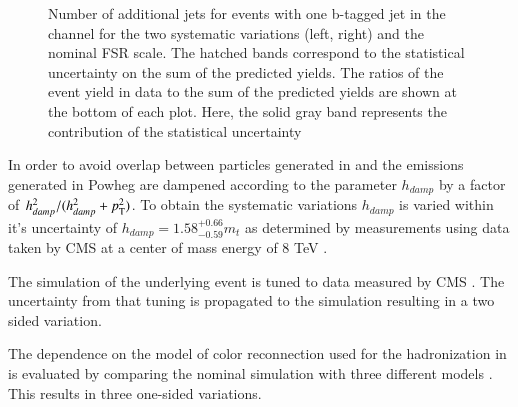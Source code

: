 \begin{figure}[htbp!]
\begin{center}
\caption{Number of additional jets for events with one b-tagged jet in the \emu channel for the two systematic variations (left, right) and the nominal FSR scale.
The hatched bands correspond to the statistical uncertainty on the sum of the predicted yields. 
        The ratios of the event yield in data to the sum of the predicted yields are
        shown at the bottom of each plot. Here, the solid gray band
        represents the contribution of the statistical uncertainty
  \label{fig:control_var_TT_FSRSCALE}}
  \end{center}
\end{figure}


In order to avoid overlap between particles generated in \POWHEG and \PYTHIA the emissions generated in Powheg are dampened according to the parameter $h_{damp}$ by a factor of $h_{damp}^2 / (h_{damp}^2 + p_{\mathrm{T}}^2)$.
To obtain the systematic variations $h_{damp}$ is varied within it's uncertainty of $h_{damp} = 1.58^{+0.66}_{-0.59} m_t$
as determined by measurements using data taken by CMS at a center of mass energy of 8 TeV \cite{CMS-PAS-TOP-16-021}.

The simulation of the underlying event is tuned to data measured by CMS \cite{CMS-PAS-TOP-16-021}. The uncertainty from that tuning is propagated to the simulation resulting in a two sided variation.

The dependence on the model of color reconnection used for the hadronization in \PYTHIA is evaluated by comparing the nominal simulation with three different models \cite{Argyropoulos:2014zoa,Christiansen:2015yqa}. This results in three one-sided variations.


